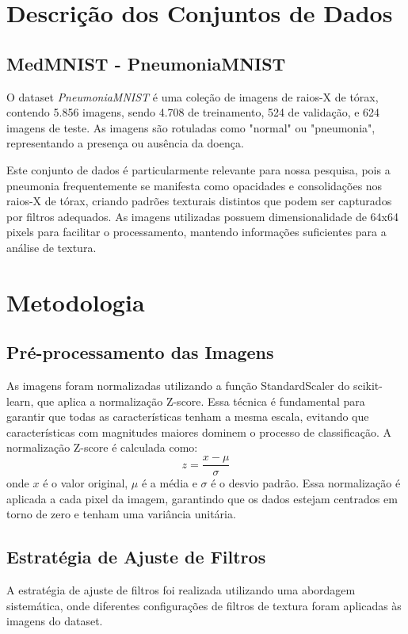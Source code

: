 \documentclass[sigconf,nonacm]{acmart}
\begin{document}
\section{Descrição dos Conjuntos de Dados}
\subsection{MedMNIST - PneumoniaMNIST}

O dataset \textit{PneumoniaMNIST} \cite{medmnistv1_2021} é uma coleção de imagens de raios-X de tórax, contendo 5.856 imagens, sendo 4.708 de treinamento, 524 de validação, e 624 imagens de teste. As imagens são rotuladas como "normal" ou "pneumonia", representando a presença ou ausência da doença.

Este conjunto de dados é particularmente relevante para nossa pesquisa, pois a pneumonia frequentemente se manifesta como opacidades e consolidações nos raios-X de tórax, criando padrões texturais distintos que podem ser capturados por filtros adequados. As imagens utilizadas possuem dimensionalidade de 64x64 pixels para facilitar o processamento, mantendo informações suficientes para a análise de textura.

\section{Metodologia}

\subsection{Pré-processamento das Imagens}

As imagens foram normalizadas utilizando a função StandardScaler do scikit-learn, que aplica a normalização Z-score. Essa técnica é fundamental para garantir que todas as características tenham a mesma escala, evitando que características com magnitudes maiores dominem o processo de classificação.
A normalização Z-score é calculada como:
\[
z = \frac{x - \mu}{\sigma}
\]
onde \(x\) é o valor original, \(\mu\) é a média e \(\sigma\) é o desvio padrão. Essa normalização é aplicada a cada pixel da imagem, garantindo que os dados estejam centrados em torno de zero e tenham uma variância unitária.

\subsection{Estratégia de Ajuste de Filtros}

A estratégia de ajuste de filtros foi realizada utilizando uma abordagem sistemática, onde diferentes configurações de filtros de textura foram aplicadas às imagens do dataset. 
\end{document}
